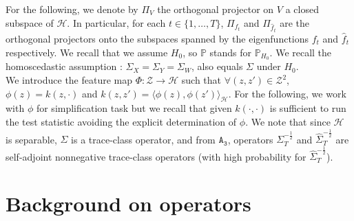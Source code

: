 \documentclass[twoside,11pt]{article}
\newcommand{\Hk}{\mathcal{H}}
\newcommand{\PP}{\mathbb{P}}%
\newcommand{\SW}{\Sigma}
\newcommand{\ST}{\Sigma_{T}}
\newcommand{\hS}{\widehat{\Sigma}}
\newcommand{\hST}{\widehat{\Sigma}_{T}}
\newcommand{\A}[1]{$\mathtt{A_#1}$}
\begin{document}
\medskip

\medskip

For the following, we denote by $\Pi_{V}$ the orthogonal projector on $V$ a closed subspace of $\Hk$. In particular, for each $t \in \{1,\ldots,T\}$, $\Pi_{f_t}$ and $\Pi_{\widehat{f}_t}$ are the orthogonal projectors onto the subspaces spanned by the eigenfunctions $f_t$ and $\widehat{f}_t$ respectively. 
We recall that we assume $H_0$, so $\PP$ stands for $\PP_{H_0}$.
We recall the homoscedastic assumption : $\Sigma_{X} = \Sigma_{Y} = \Sigma_W$, also equals $\Sigma$ under $H_0$. \\
We introduce the feature map $\Phi : \mathcal{Z} \rightarrow \Hk$ such that $\forall (z,z') \in \mathcal{Z}^2$, $\phi(z) = k(z,\cdot)$ and $k(z, z') = \langle \phi(z), \phi(z')\rangle_{\Hk}$. For the following, we work with $\phi$ for simplification task but we recall that given $k(\cdot,\cdot)$ is sufficient to run the test statistic avoiding the explicit determination of $\phi$. 
We note that since $\Hk$ is separable, 
$\Sigma$ is a trace-class operator, and from \A{3}, operators $\Sigma_T^{-\frac{1}{2}}$ and $\widehat{\Sigma}_T^{-\frac{1}{2}}$ are self-adjoint nonnegative trace-class operators (with high probability for $\widehat{\Sigma}_T^{-\frac{1}{2}}$). 

\section{Background on operators}
\label{Appendice_Operators}
\end{document}
